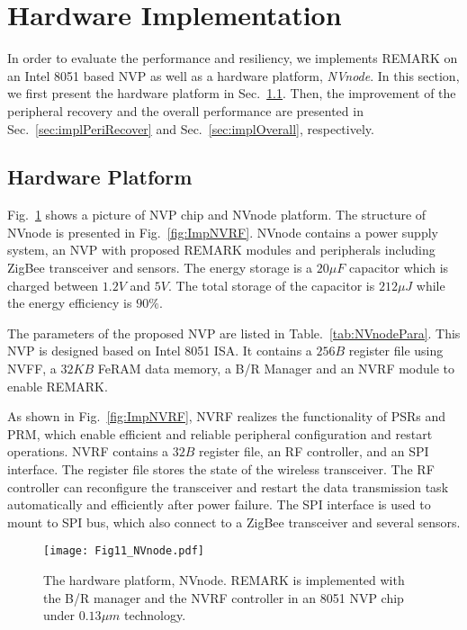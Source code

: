 \section{Hardware Implementation} \label{sec:implementation}
\vspace{-5pt}
%
In order to evaluate the performance and resiliency, we implements REMARK on an Intel 8051 based NVP as well as a hardware platform, \emph{NVnode}.
In this section, we first present the hardware platform in Sec.~\ref{sec:implHW}. 
Then, the improvement of the peripheral recovery and the overall performance are presented in Sec.~\ref{sec:implPeriRecover} and Sec.~\ref{sec:implOverall}, respectively. 

\subsection{Hardware Platform} \label{sec:implHW}
\vspace{-5pt}
Fig.~\ref{fig:NVnode} shows a picture of NVP chip and NVnode platform.
The structure of NVnode is presented in Fig.~\ref{fig:ImpNVRF}.
NVnode contains a power supply system, an NVP with proposed REMARK modules and peripherals including ZigBee transceiver and sensors.
The energy storage is a $20\mu F$ capacitor which is charged between $1.2V$ and $5V$.
The total storage of the capacitor is $212\mu J$ while the energy efficiency is $90\%$.

The parameters of the proposed NVP are listed in Table.~\ref{tab:NVnodePara}.
This NVP is designed based on Intel 8051 ISA. 
It contains a $256B$ register file using NVFF, a $32KB$ FeRAM data memory, a B/R Manager and an NVRF module to enable REMARK.

As shown in Fig.~\ref{fig:ImpNVRF}, NVRF realizes the functionality of PSRs and PRM, which enable efficient and reliable peripheral configuration and restart operations.
NVRF contains a $32B$ register file, an RF controller, and an SPI interface.
The register file stores the state of the wireless transceiver.
The RF controller can reconfigure the transceiver and restart the data transmission task automatically and efficiently after power failure.
The SPI interface is used to mount to SPI bus, which also connect to a ZigBee transceiver and several sensors.

%
\begin{figure}[t]
    \centering
    \texttt{[image: Fig11\_NVnode.pdf]}
    \vspace{-10pt}
    \caption{The hardware platform, NVnode. REMARK is implemented with the B/R manager and the NVRF controller in an 8051 NVP chip under $0.13\mu m$ technology.}
    \vspace{-5pt}
    \label{fig:NVnode}
\end{figure}

